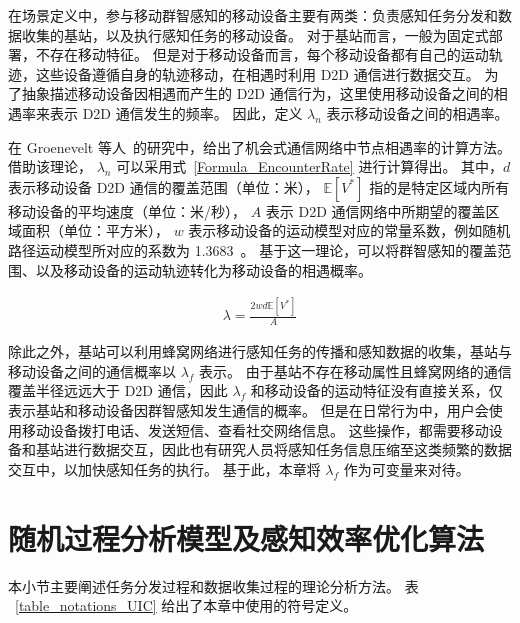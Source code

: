 在场景定义中，参与移动群智感知的移动设备主要有两类：负责感知任务分发和数据收集的基站，以及执行感知任务的移动设备。
对于基站而言，一般为固定式部署，不存在移动特征。
但是对于移动设备而言，每个移动设备都有自己的运动轨迹，这些设备遵循自身的轨迹移动，在相遇时利用 D2D 通信进行数据交互。
为了抽象描述移动设备因相遇而产生的 D2D 通信行为，这里使用移动设备之间的相遇率来表示 D2D 通信发生的频率。
因此，定义 $\lambda_n$ 表示移动设备之间的相遇率。

在 Groenevelt 等人~\cite{DBLP:journals/pe/GroeneveltNK05}的研究中，给出了机会式通信网络中节点相遇率的计算方法。
借助该理论， $\lambda_n$ 可以采用式~\eqref{Formula_EncounterRate} 进行计算得出。
其中，$d$ 表示移动设备 D2D 通信的覆盖范围（单位：米），
$\mathbb{E}[V^*]$ 指的是特定区域内所有移动设备的平均速度（单位：米/秒），
$A$ 表示 D2D 通信网络中所期望的覆盖区域面积（单位：平方米），
$w$ 表示移动设备的运动模型对应的常量系数，例如随机路径运动模型所对应的系数为 1.3683~\cite{DBLP:journals/pe/GroeneveltNK05}。
基于这一理论，可以将群智感知的覆盖范围、以及移动设备的运动轨迹转化为移动设备的相遇概率。

\vspace{-1em}
\begin{equation}
  \label{Formula_EncounterRate}
  \begin{gathered}
  \lambda = \frac{2 w d \mathbb{E}[V^*]}{A}
  \end{gathered}
\end{equation}

除此之外，基站可以利用蜂窝网络进行感知任务的传播和感知数据的收集，基站与移动设备之间的通信概率以 $\lambda_f$ 表示。
由于基站不存在移动属性且蜂窝网络的通信覆盖半径远远大于 D2D 通信，因此 $\lambda_f$ 和移动设备的运动特征没有直接关系，仅表示基站和移动设备因群智感知发生通信的概率。
但是在日常行为中，用户会使用移动设备拨打电话、发送短信、查看社交网络信息。
这些操作，都需要移动设备和基站进行数据交互，因此也有研究人员将感知任务信息压缩至这类频繁的数据交互中，以加快感知任务的执行。
基于此，本章将 $\lambda_f$ 作为可变量来对待。


\section{随机过程分析模型及感知效率优化算法}
本小节主要阐述任务分发过程和数据收集过程的理论分析方法。
表 ~\ref{table_notations_UIC} 给出了本章中使用的符号定义。

